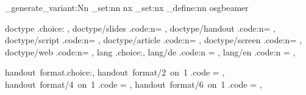 \ExplSyntaxOn
\cs_generate_variant:Nn \keys_set:nn { nx } %
\let\SetKeyEx=\keys_set:nx                  %
\keys_define:nn {osgbeamer}{
  doctype .choice: ,
  doctype/slides .code:n={
    \gdef\osgparentclass{beamer}
    \togglefalse{osgscript}
  },
  doctype/handout .code:n={
    \togglefalse{osgscript}
  },
  doctype/script .code:n={
    \toggletrue{osgscript}
  },
  doctype/article .code:n={
    \toggletrue{osgscript}
  },
  doctype/screen .code:n={
    \togglefalse{osgscript}
  },
  doctype/web .code:n={
  },
  lang .choice:,
  lang/de .code:n = {
    \providecommand\selectedbeamerlanguage{de}
  },
  lang/en .code:n = {
    \providecommand\selectedbeamerlanguage{en}
  },
  
  handout~format.choice:,
  handout~format/2~on~1 .code ={
    \gdef\osg@pgfpageoptions{{2~on~1}[a4paper, border~shrink=2mm]}
  },
  handout~format/4~on~1 .code ={
    \gdef\osg@pgfpageoptions{{4~on~1}[a4paper, landscape, border~shrink=2mm]}
  },
  handout~format/6~on~1 .code ={
    \gdef\osg@pgfpageoptions{{6~on~1}[a4paper, border~shrink=2mm]}
  },
}
\ExplSyntaxOff

